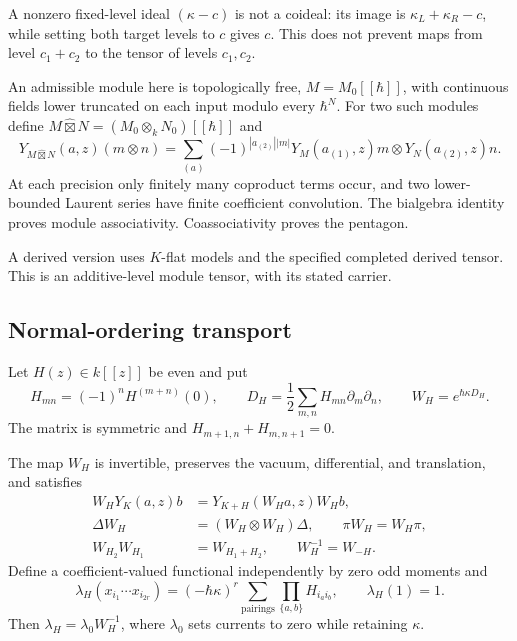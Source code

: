 A nonzero fixed-level ideal $(\kappa-c)$ is not a coideal:
its image is $\kappa_L+\kappa_R-c$, while setting both
target levels to $c$ gives $c$.
This does not prevent maps from level $c_1+c_2$ to the
tensor of levels $c_1,c_2$.

An admissible module here is topologically free,
$M=M_0[[\hbar]]$, with continuous fields lower truncated
on each input modulo every $\hbar^N$.
For two such modules define
$M\widehat\boxtimes N=(M_0\otimes_kN_0)[[\hbar]]$ and
\[
 Y_{M\widehat\boxtimes N}(a,z)(m\otimes n)
 =\sum_{(a)}(-1)^{|a_{(2)}||m|}
 Y_M(a_{(1)},z)m\otimes Y_N(a_{(2)},z)n.
\]
At each precision only finitely many coproduct terms occur,
and two lower-bounded Laurent series have finite
coefficient convolution. The bialgebra identity proves
module associativity. Coassociativity proves the pentagon.

A derived version uses $K$-flat models and the specified
completed derived tensor. This is an additive-level
module tensor, with its stated carrier.

\subsection{Normal-ordering transport}

Let $H(z)\in k[[z]]$ be even and put
\[
 H_{mn}=(-1)^nH^{(m+n)}(0),\qquad
 D_H=\frac12\sum_{m,n}H_{mn}\partial_m\partial_n,\qquad
 W_H=e^{\hbar\kappa D_H}.
\]
The matrix is symmetric and
$H_{m+1,n}+H_{m,n+1}=0$.

\begin{proposition}
\label{v4-arith:centers:prop:normal-ordering}
The map $W_H$ is invertible, preserves the vacuum,
differential, and translation, and satisfies
\[
 \begin{split}
 W_HY_K(a,z)b&=Y_{K+H}(W_Ha,z)W_Hb,\\
 \Delta W_H&=(W_H\otimes W_H)\Delta,\qquad
 \pi W_H=W_H\pi,\\
 W_{H_2}W_{H_1}&=W_{H_1+H_2},\qquad W_H^{-1}=W_{-H}.
 \end{split}
\]
Define a coefficient-valued functional independently by
zero odd moments and
\[
 \lambda_H(x_{i_1}\cdots x_{i_{2r}})
 =(-\hbar\kappa)^r
 \sum_{\text{pairings}}\prod_{\{a,b\}}H_{i_ai_b},
 \qquad \lambda_H(1)=1.
\]
Then $\lambda_H=\lambda_0W_H^{-1}$, where $\lambda_0$
sets currents to zero while retaining $\kappa$.
\end{proposition}

